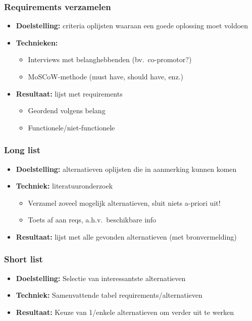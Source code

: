 \documentclass[aspectratio=169]{beamer}
\begin{document}
\begin{frame}
  \frametitle{Requirements verzamelen}

  \begin{itemize}
    \item \textbf{Doelstelling:} criteria oplijsten waaraan een goede oplossing moet voldoen
    \item \textbf{Technieken:}
      \begin{itemize}
        \item Interviews met belanghebbenden (bv.\ co-promotor?)
        \item MoSCoW-methode (must have, should have, enz.)
      \end{itemize}
    \item \textbf{Resultaat:} lijst met requirements
      \begin{itemize}
        \item Geordend volgens belang
        \item Functionele/niet-functionele
      \end{itemize}
  \end{itemize}

\end{frame}

\begin{frame}
  \frametitle{Long list}

  \begin{itemize}
    \item \textbf{Doelstelling:} alternatieven oplijsten die in aanmerking kunnen komen
    \item \textbf{Techniek:} literatuuronderzoek
      \begin{itemize}
        \item Verzamel zoveel mogelijk alternatieven, sluit niets a-priori uit!
        \item Toets af aan reqs, a.h.v.\ beschikbare info
      \end{itemize}
    \item \textbf{Resultaat:} lijst met alle gevonden alternatieven (met bronvermelding)
  \end{itemize}

\end{frame}

\begin{frame}
  \frametitle{Short list}

  \begin{itemize}
    \item \textbf{Doelstelling:} Selectie van interessantste alternatieven
    \item \textbf{Techniek:} Samenvattende tabel requirements/alternatieven
    \item \textbf{Resultaat:} Keuze van 1/enkele alternatieven om verder uit te werken
  \end{itemize}

\end{frame}
\end{document}

